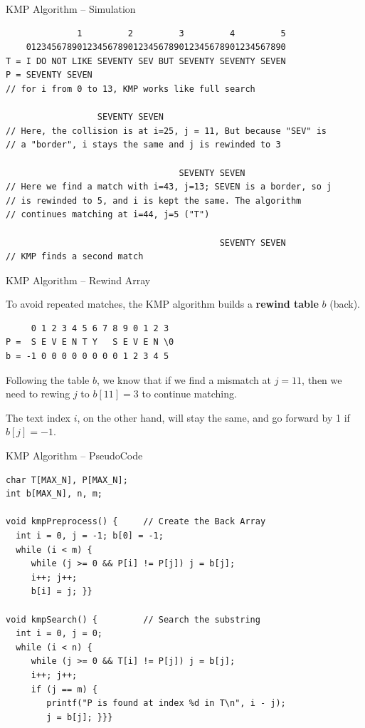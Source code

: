\begin{frame}[fragile]{KMP Algorithm -- Simulation}

{\smaller
\begin{verbatim}
              1         2         3         4         5
    012345678901234567890123456789012345678901234567890
T = I DO NOT LIKE SEVENTY SEV BUT SEVENTY SEVENTY SEVEN
P = SEVENTY SEVEN
// for i from 0 to 13, KMP works like full search

                  SEVENTY SEVEN
// Here, the collision is at i=25, j = 11, But because "SEV" is
// a "border", i stays the same and j is rewinded to 3

                                  SEVENTY SEVEN
// Here we find a match with i=43, j=13; SEVEN is a border, so j
// is rewinded to 5, and i is kept the same. The algorithm
// continues matching at i=44, j=5 ("T")

                                          SEVENTY SEVEN
// KMP finds a second match
\end{verbatim}}

\end{frame}


\begin{frame}[fragile]{KMP Algorithm -- Rewind Array}

\begin{block}{}
To avoid repeated matches, the KMP algorithm builds a {\bf rewind table} $b$ (back).

\begin{verbatim}
     0 1 2 3 4 5 6 7 8 9 0 1 2 3
P =  S E V E N T Y   S E V E N \0
b = -1 0 0 0 0 0 0 0 0 1 2 3 4 5
\end{verbatim}

Following the table $b$, we know that if we find a mismatch at $j = 11$, then we need to rewing $j$ to $b[11] = 3$ to continue matching.\bigskip

The text index $i$, on the other hand, will stay the same, and go forward by 1 if $b[j] = -1$.
    \end{block}
\end{frame}

\begin{frame}[fragile]{KMP Algorithm -- PseudoCode}

  {\smaller
  \begin{exampleblock}{}
\begin{verbatim}
char T[MAX_N], P[MAX_N];
int b[MAX_N], n, m;

void kmpPreprocess() {     // Create the Back Array
  int i = 0, j = -1; b[0] = -1;
  while (i < m) {
     while (j >= 0 && P[i] != P[j]) j = b[j];
     i++; j++;
     b[i] = j; }}

void kmpSearch() {         // Search the substring
  int i = 0, j = 0;
  while (i < n) {
     while (j >= 0 && T[i] != P[j]) j = b[j];
     i++; j++;
     if (j == m) {
        printf("P is found at index %d in T\n", i - j);
        j = b[j]; }}}
\end{verbatim}
  \end{exampleblock}
  }
\end{frame}

